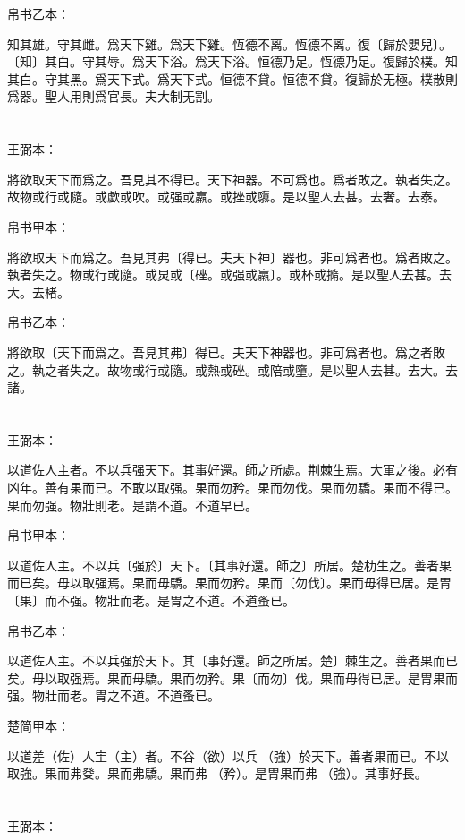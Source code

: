 \documentclass[a5paper]{ctexbook}
\begin{document}
    帛书乙本：

    知其雄。守其雌。爲天下雞。爲天下雞。恆德不离。恆德不离。復〔歸於嬰兒〕。〔知〕其白。守其辱。爲天下浴。爲天下浴。恒德乃足。恆德乃足。復歸於樸。知其白。守其黑。爲天下式。爲天下式。恒德不貸。恒德不貸。復歸於无極。樸散則爲器。聖人用則爲官長。夫大制无割。

    \chapter{}
    王弼本：

    將欲取天下而爲之。吾見其不得已。天下神器。不可爲也。爲者敗之。執者失之。故物或行或隨。或歔或吹。或强或羸。或挫或隳。是以聖人去甚。去奢。去泰。

    
    帛书甲本：

    將欲取天下而爲之。吾見其弗〔得已。夫天下神〕器也。非可爲者也。爲者敗之。執者失之。物或行或隨。或炅或〔䂳。或强或羸〕。或杯或撱。是以聖人去甚。去大。去楮。

    帛书乙本：

    將欲取〔天下而爲之。吾見其弗〕得已。夫天下神器也。非可爲者也。爲之者敗之。執之者失之。故物或行或隨。或熱或䂳。或陪或墮。是以聖人去甚。去大。去諸。

    \chapter{}
    王弼本：

    以道佐人主者。不以兵强天下。其事好還。師之所處。荆棘生焉。大軍之後。必有凶年。善有果而已。不敢以取强。果而勿矜。果而勿伐。果而勿驕。果而不得已。果而勿强。物壯則老。是謂不道。不道早已。

    
    帛书甲本：

    以道佐人主。不以兵〔强於〕天下。〔其事好還。師之〕所居。楚朸生之。善者果而已矣。毋以取强焉。果而毋驕。果而勿矜。果而〔勿伐〕。果而毋得已居。是胃〔果〕而不强。物壯而老。是胃之不道。不道蚤已。

    帛书乙本：

    以道佐人主。不以兵强於天下。其〔事好還。師之所居。楚〕棘生之。善者果而已矣。毋以取强焉。果而毋驕。果而勿矜。果〔而勿〕伐。果而毋得已居。是胃果而强。物壯而老。胃之不道。不道蚤已。

    楚简甲本：

    以道差（佐）人宔（主）者。不谷（欲）以兵󶴘（強）於天下。善者果而已。不以取強。果而弗癹。果而弗驕。果而弗󶴙（矜）。是胃果而弗󶴘（強）。其事好長。

    \chapter{}
    王弼本：
\end{document}
